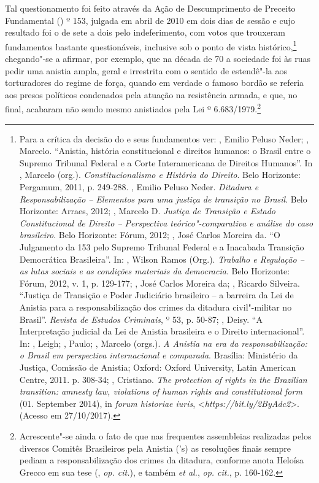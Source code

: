 Tal questionamento foi feito através da Ação de Descumprimento de
Preceito Fundamental () º 153, julgada em abril de 2010 em dois
dias de sessão e cujo resultado foi o de sete a dois pelo indeferimento,
com votos que trouxeram fundamentos bastante questionáveis, inclusive
sob o ponto de vista histórico,\footnote{Para a crítica da decisão do 
  e seus fundamentos ver: , Emilio Peluso Neder; , Marcelo.
  ``Anistia, história constitucional e direitos humanos: o Brasil entre o
  Supremo Tribunal Federal e a Corte Interamericana de Direitos Humanos''.
  In , Marcelo (org.). \emph{Constitucionalismo e História do
  Direito}. Belo Horizonte: Pergamum, 2011, p. 249-288. , Emilio
  Peluso Neder. \emph{Ditadura e Responsabilização -- Elementos para
  uma justiça de transição no Brasil}. Belo Horizonte: Arraes, 2012;
  , Marcelo D. \emph{Justiça de Transição e Estado
  Constitucional de Direito -- Perspectiva teórico"-comparativa e análise
  do caso brasileiro}. Belo Horizonte: Fórum, 2012;  , José
  Carlos Moreira da. ``O Julgamento da  153 pelo Supremo Tribunal
  Federal e a Inacabada Transição Democrática Brasileira''. In: ,
  Wilson Ramos (Org.). \emph{Trabalho e Regulação -- as lutas sociais e
  as condições materiais da democracia}. Belo Horizonte: Fórum, 2012,
  v. 1, p. 129-177;  , José Carlos
  Moreira da; , Ricardo
  Silveira. ``Justiça de Transição e Poder Judiciário brasileiro -- a
  barreira da Lei de Anistia para a responsabilização dos crimes da
  ditadura civil"-militar no Brasil''. \emph{Revista de Estudos
  Criminais}, º 53, p. 50-87; ,
  Deisy. ``A Interpretação judicial da
  Lei de Anistia brasileira e o Direito internacional''. In: , Leigh;
  , Paulo; , Marcelo (orgs.). \emph{A Anistia na era da
  responsabilização: o Brasil em perspectiva internacional e comparada}.
  Brasília: Ministério da Justiça, Comissão de Anistia; Oxford: Oxford
  University, Latin American Centre, 2011. p. 308-34; ,
  Cristiano. \emph{The protection of rights in the Brazilian transition:
  amnesty law, violations of human rights and constitutional form} (01.
  September 2014), in \emph{forum historiae
  iuris}, \textless{}\emph{https://bit.ly/2ByAdc2}\textgreater{}.
  (Acesso em 27/10/2017).} chegando"-se a afirmar, por exemplo, que na
década de 70 a sociedade foi às ruas pedir uma anistia ampla, geral e
irrestrita com o sentido de estendê"-la aos torturadores do regime de
força, quando em verdade o famoso bordão se referia aos presos políticos
condenados pela atuação na resistência armada, e que, no final, acabaram
não sendo mesmo anistiados pela Lei º 6.683/1979.\footnote{Acrescente"-se
  ainda o fato de que nas frequentes assembleias realizadas pelos
  diversos Comitês Brasileiros pela Anistia ('s) as resoluções finais
  sempre pediam a responsabilização dos crimes da ditadura, conforme
  anota Heloísa Grecco em sua tese (, \emph{op. cit.}), e também 
  \emph{et al.}, \emph{op. cit.}, p. 160-162.}


